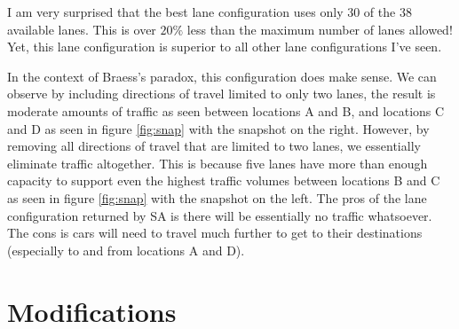 \documentclass[11pt]{article}
\begin{document}
I am very surprised that the best lane configuration uses only 30 of the 38 available lanes. This is over $20\%$ less than the maximum number of lanes allowed! Yet, this lane configuration is superior to all other lane configurations I've seen. 

In the context of Braess's paradox, this configuration does make sense. We can observe by including directions of travel limited to only two lanes, the result is moderate amounts of traffic as seen between locations A and B, and locations C and D as seen in figure \ref{fig:snap} with the snapshot on the right. However, by removing all directions of travel that are limited to two lanes, we essentially eliminate traffic altogether. This is because five lanes have more than enough capacity to support even the highest traffic volumes between locations B and C as seen in figure \ref{fig:snap} with the snapshot on the left. The pros of the lane configuration returned by SA is there will be essentially no traffic whatsoever. The cons is cars will need to travel much further to get to their destinations (especially to and from locations A and D).
\section{Modifications}
\end{document}
